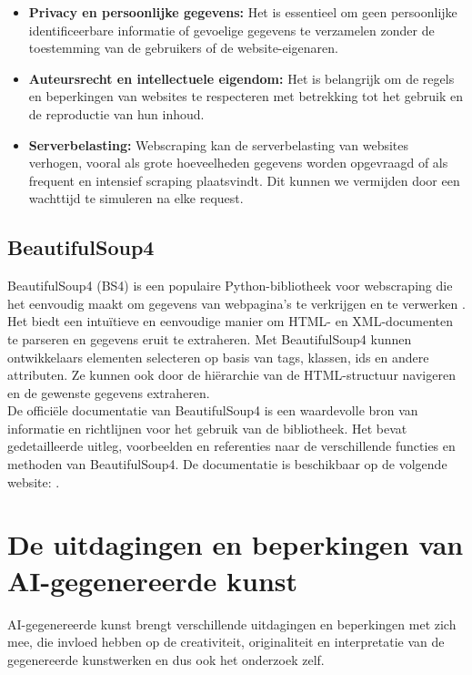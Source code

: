 \begin{itemize}
    \item \textbf{Privacy en persoonlijke gegevens:} Het is essentieel om geen persoonlijke identificeerbare informatie of gevoelige gegevens te verzamelen zonder de toestemming van de gebruikers of de website-eigenaren.
    \item \textbf{Auteursrecht en intellectuele eigendom:} Het is belangrijk om de regels en beperkingen van websites te respecteren met betrekking tot het gebruik en de reproductie van hun inhoud.
    \item \textbf{Serverbelasting:} Webscraping kan de serverbelasting van websites verhogen, vooral als grote hoeveelheden gegevens worden opgevraagd of als frequent en intensief scraping plaatsvindt. Dit kunnen we vermijden door een wachttijd te simuleren na elke request. 
\end{itemize}

\subsection{BeautifulSoup4}
BeautifulSoup4 (BS4) is een populaire Python-bibliotheek voor webscraping die het eenvoudig maakt om gegevens van webpagina's te verkrijgen en te verwerken \autocite{BIO2014, BSFOR2015}. \\

Het biedt een intuïtieve en eenvoudige manier om HTML- en XML-documenten te parseren en gegevens eruit te extraheren. Met BeautifulSoup4 kunnen ontwikkelaars elementen selecteren op basis van tags, klassen, ids en andere attributen. Ze kunnen ook door de hiërarchie van de HTML-structuur navigeren en de gewenste gegevens extraheren. \\

De officiële documentatie van BeautifulSoup4 is een waardevolle bron van informatie en richtlijnen voor het gebruik van de bibliotheek. Het bevat gedetailleerde uitleg, voorbeelden en referenties naar de verschillende functies en methoden van BeautifulSoup4. 
De documentatie is beschikbaar op de volgende website: \autocite{BS4Documentation}. \\


\section{De uitdagingen en beperkingen van AI-gegenereerde kunst}
AI-gegenereerde kunst brengt verschillende uitdagingen en beperkingen met zich mee, die invloed hebben op de creativiteit, originaliteit en interpretatie van de gegenereerde kunstwerken en dus ook het onderzoek zelf.

